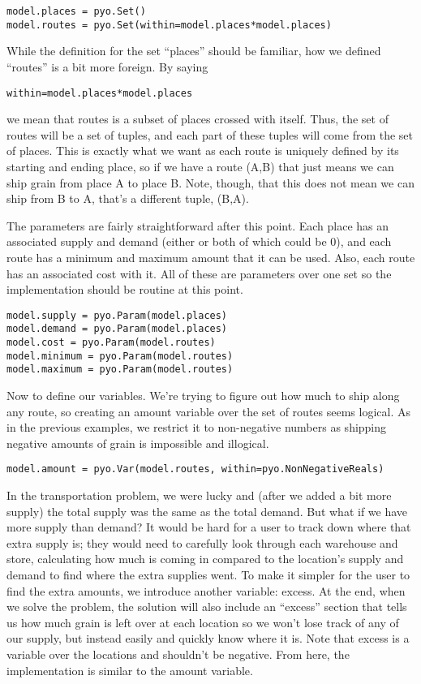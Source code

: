\documentclass{article}
\begin{document}
\begin{verbatim}
model.places = pyo.Set()
model.routes = pyo.Set(within=model.places*model.places)
\end{verbatim}

While the definition for the set ``places'' should be familiar, how we defined ``routes'' is a bit more foreign.  By saying \begin{verbatim}within=model.places*model.places\end{verbatim} we mean that routes is a subset of places crossed with itself.  Thus, the set of routes will be a set of tuples, and each part of these tuples will come from the set of places.  This is exactly what we want as each route is uniquely defined by its starting and ending place, so if we have a route (A,B) that just means we can ship grain from place A to place B.  Note, though, that this does not mean we can ship from B to A, that's a different tuple, (B,A).

The parameters are fairly straightforward after this point.  Each place has an associated supply and demand (either or both of which could be $0$), and each route has a minimum and maximum amount that it can be used.  Also, each route has an associated cost with it.  All of these are parameters over one set so the implementation should be routine at this point.

\begin{verbatim}
model.supply = pyo.Param(model.places)
model.demand = pyo.Param(model.places)
model.cost = pyo.Param(model.routes)
model.minimum = pyo.Param(model.routes)
model.maximum = pyo.Param(model.routes)
\end{verbatim}

Now to define our variables.  We're trying to figure out how much to ship along any route, so creating an amount variable over the set of routes seems logical.  As in the previous examples, we restrict it to non-negative numbers as shipping negative amounts of grain is impossible and illogical.

\begin{verbatim}
model.amount = pyo.Var(model.routes, within=pyo.NonNegativeReals)
\end{verbatim}

In the transportation problem, we were lucky and (after we added a bit more supply) the total supply was the same as the total demand.  But what if we have more supply than demand?  It would be hard for a user to track down where that extra supply is; they would need to carefully look through each warehouse and store, calculating how much is coming in compared to the location's supply and demand to find where the extra supplies went.  To make it simpler for the user to find the extra amounts, we introduce another variable: excess.  At the end, when we solve the problem, the solution will also include an ``excess'' section that tells us how much grain is left over at each location so we won't lose track of any of our supply, but instead easily and quickly know where it is.  Note that excess is a variable over the locations and shouldn't be negative.  From here, the implementation is similar to the amount variable.
\end{document}
